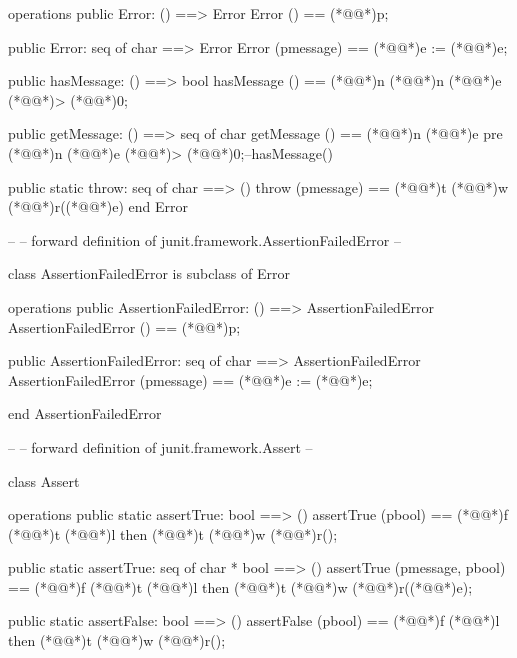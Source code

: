 \documentclass[a4paper]{article}
\begin{document}
\begin{vdm_al}
operations
  public Error: () ==> Error
  Error () == (*@@*)p;
  
  public Error: seq of char ==> Error
  Error (pmessage) == (*@@*)e := (*@@*)e;

  public hasMessage: () ==> bool
  hasMessage () == (*@@*)n (*@@*)n (*@@*)e (*@\vdmnotcovered{}@*)> (*@\vdmnotcovered{}@*)0;
    
  public getMessage: () ==> seq of char
  getMessage () == (*@@*)n (*@@*)e
    pre (*@@*)n (*@@*)e (*@\vdmnotcovered{}@*)> (*@\vdmnotcovered{}@*)0;--hasMessage()


  public static throw: seq of char ==> ()
  throw (pmessage) == (*@@*)t (*@@*)w (*@@*)r((*@@*)e)
end Error

--
-- forward definition of junit.framework.AssertionFailedError
--

class AssertionFailedError is subclass of Error

operations
  public AssertionFailedError: () ==> AssertionFailedError
  AssertionFailedError () == (*@@*)p;
  
  public AssertionFailedError: seq of char ==> AssertionFailedError
  AssertionFailedError (pmessage) == (*@@*)e := (*@@*)e;
   
end AssertionFailedError

--
-- forward definition of junit.framework.Assert
--

class Assert

operations
  public static assertTrue: bool ==> ()
  assertTrue (pbool) ==
    (*@@*)f (*@@*)t (*@@*)l then (*@@*)t (*@@*)w (*@@*)r();
  
  public static assertTrue: seq of char * bool ==> ()
  assertTrue (pmessage, pbool) ==
    (*@@*)f (*@@*)t (*@@*)l then (*@@*)t (*@@*)w (*@@*)r((*@@*)e);
    
  public static assertFalse: bool ==> ()
  assertFalse (pbool) ==
    (*@@*)f (*@@*)l then (*@@*)t (*@@*)w (*@@*)r();
  

\end{vdm_al}
\end{document}
